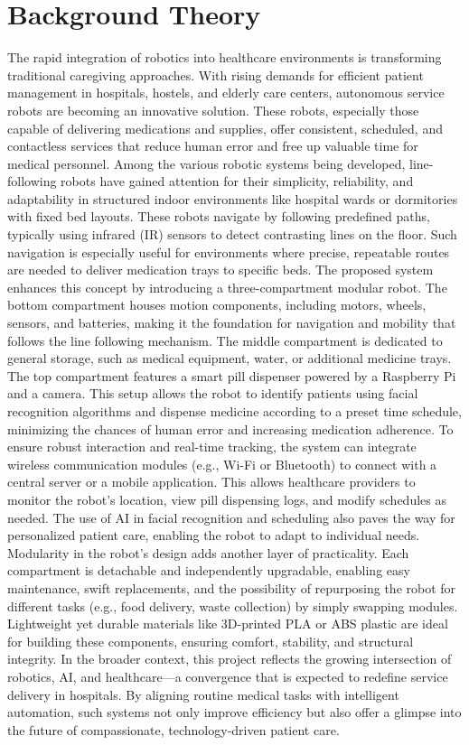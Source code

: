 \section{Background Theory}
The rapid integration of robotics into healthcare environments is transforming traditional caregiving approaches. With rising demands for efficient patient management in hospitals, hostels, and elderly care centers, autonomous service robots are becoming an innovative solution. These robots, especially those capable of delivering medications and supplies, offer consistent, scheduled, and contactless services that reduce human error and free up valuable time for medical personnel.
Among the various robotic systems being developed, line-following robots have gained attention for their simplicity, reliability, and adaptability in structured indoor environments like hospital wards or dormitories with fixed bed layouts. These robots navigate by following predefined paths, typically using infrared (IR) sensors to detect contrasting lines on the floor. Such navigation is especially useful for environments where precise, repeatable routes are needed to deliver medication trays to specific beds.
The proposed system enhances this concept by introducing a three-compartment modular robot. The bottom compartment houses motion components, including motors, wheels, sensors, and batteries, making it the foundation for navigation and mobility that follows the line following mechanism. The middle compartment is dedicated to general storage, such as medical equipment, water, or additional medicine trays. The top compartment features a smart pill dispenser powered by a Raspberry Pi and a camera. This setup allows the robot to identify patients using facial recognition algorithms and dispense medicine according to a preset time schedule, minimizing the chances of human error and increasing medication adherence.
To ensure robust interaction and real-time tracking, the system can integrate wireless communication modules (e.g., Wi-Fi or Bluetooth) to connect with a central server or a mobile application. This allows healthcare providers to monitor the robot’s location, view pill dispensing logs, and modify schedules as needed. The use of AI in facial recognition and scheduling also paves the way for personalized patient care, enabling the robot to adapt to individual needs.
Modularity in the robot’s design adds another layer of practicality. Each compartment is detachable and independently upgradable, enabling easy maintenance, swift replacements, and the possibility of repurposing the robot for different tasks (e.g., food delivery, waste collection) by simply swapping modules. Lightweight yet durable materials like 3D-printed PLA or ABS plastic are ideal for building these components, ensuring comfort, stability, and structural integrity.
In the broader context, this project reflects the growing intersection of robotics, AI, and healthcare—a convergence that is expected to redefine service delivery in hospitals. By aligning routine medical tasks with intelligent automation, such systems not only improve efficiency but also offer a glimpse into the future of compassionate, technology-driven patient care.


